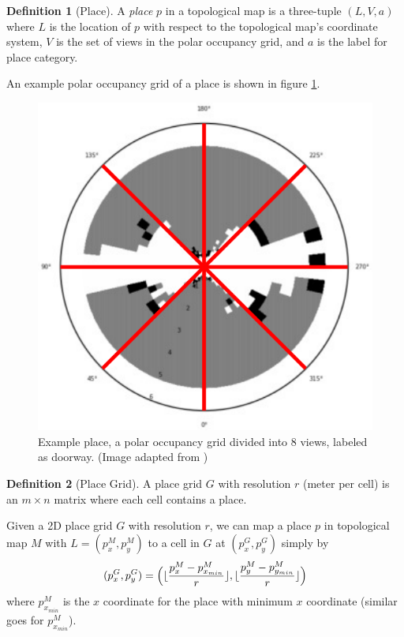 \documentclass[10pt, titlepage]{article}
\theoremstyle{definition}
\newtheorem{definition}{Definition}[section]
\DeclarePairedDelimiter\floor{\lfloor}{\rfloor}
\begin{document}
\begin{definition}[Place]
A \textit{place} $p$ in a topological map is a three-tuple $(L, V, a)$ where $L$ is the location of $p$ with respect to the topological map's coordinate system, $V$ is the set of views in the polar occupancy grid, and $a$ is the label for place category.
\end{definition}

\noindent An example polar occupancy grid of a place is shown in figure \ref{fig:place}.

\begin{figure}[!htb]
    \centering
    \captionsetup{width=.5\linewidth}
    \includegraphics[scale=0.15]{images/polar_grid.png}
    \caption{Example place, a polar occupancy grid divided into 8 views, labeled as doorway. (Image adapted from \cite{pronobis2016learning})}
    \label{fig:place}
\end{figure}

\begin{definition}[Place Grid]
A place grid $G$ with resolution $r$ (meter per cell) is an $m\times n$ matrix where each cell contains a place.
\end{definition}

Given a 2D place grid $G$ with resolution $r$, we can map a place $p$ in topological map $M$ with $L=(p_x^M, p_y^M)$ to a cell in $G$ at $(p_x^G, p_y^G)$ simply by
\begin{equation}
  (p_x^G, p_y^G) = \Big(\floor{\frac{p_x^M-p_{x_{min}}^M}{r}}, \floor{\frac{p_y^M-p_{y_{min}}^M}{r}}\Big)
\end{equation}
where $p_{x_{min}}^M$ is the $x$ coordinate for the place with minimum $x$ coordinate (similar goes for $p_{x_{min}}^M$).
\end{document}
